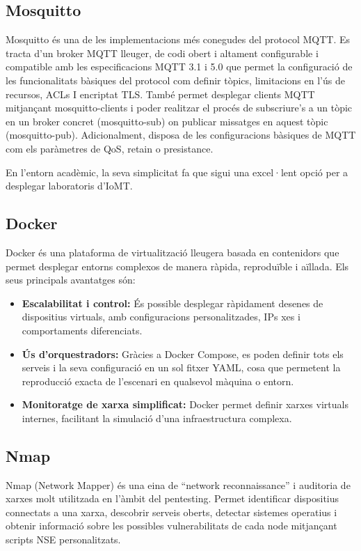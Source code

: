     \subsection{Mosquitto}
      Mosquitto és una de les implementacions més conegudes del protocol MQTT. Es tracta d’un broker MQTT lleuger, de codi obert i altament configurable i compatible amb les especificacions MQTT 3.1 i 5.0 que permet la configuració de les funcionalitats bàsiques del protocol com definir tòpics, limitacions en l'ús de recursos, ACLs I encriptat TLS. També permet desplegar clients MQTT mitjançant mosquitto-clients i poder realitzar el procés de subscriure’s a un tòpic en un broker concret (mosquitto-sub) on publicar missatges en aquest tòpic (mosquitto-pub). Adicionalment, disposa de les configuracions bàsiques de MQTT com els paràmetres de QoS, retain o presistance. \cite{Mosquittoexp}

       En l’entorn acadèmic, la seva simplicitat fa que sigui una excel·lent opció per a desplegar laboratoris d’IoMT. 

    \subsection{Docker}
    Docker és una plataforma de virtualització lleugera basada en contenidors que permet desplegar entorns complexos de manera ràpida, reproduïble i aïllada. Els seus principals avantatges són: \cite{dockerexp}
    \begin{itemize}  
      \item \textbf{Escalabilitat i control:} És possible desplegar ràpidament desenes de dispositius virtuals, amb configuracions personalitzades, IPs xes i comportaments diferenciats. 
      \item \textbf{Ús d'orquestradors:} Gràcies a Docker Compose, es poden definir tots els serveis i la seva configuració en un sol fitxer YAML, cosa que permetent la reproducció exacta de l’escenari en qualsevol màquina o entorn.
      \item \textbf{Monitoratge de xarxa simplificat:} Docker permet definir xarxes virtuals internes, facilitant la simulació d’una infraestructura complexa. 
    \end{itemize}

    \subsection{Nmap}
    Nmap (Network Mapper) és una eina de “network reconnaissance” i auditoria de xarxes molt utilitzada en l’àmbit del pentesting. Permet identificar dispositius connectats a una xarxa, descobrir serveis oberts, detectar sistemes operatius i obtenir informació sobre les possibles vulnerabilitats de cada node mitjançant scripts NSE personalitzats. \cite{Nmapexp}

